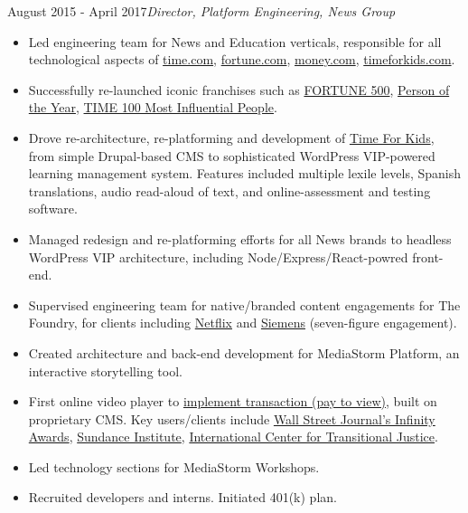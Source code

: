 \documentclass[a4paper,10pt]{memoir} %
\begin{document}
 {August 2015 - April 2017}{\textit{Director, Platform Engineering, News Group}}
\begin{itemize}
	\item Led engineering team for News and Education verticals, responsible for all technological aspects of \href{http://time.com}{time.com}, \href{http://fortune.com}{fortune.com},  \href{http://money.com}{money.com}, \href{https://www.timeforkids.com}{timeforkids.com}. 
	\item Successfully re-launched iconic franchises such as \href{http://fortune.com/fortune500}{FORTUNE 500}, \href{http://time.com/time-person-of-the-year-2017-silence-breakers/}{Person of the Year}, \href{http://time.com/collection/most-influential-people-2018/}{TIME 100 Most Influential People}.
	\item Drove re-architecture, re-platforming and development of \href{https://www.timeforkids}{Time For Kids}, from simple Drupal-based CMS to sophisticated WordPress VIP-powered learning management system. Features included multiple lexile levels, Spanish translations, audio read-aloud of text, and online-assessment and testing software.
	\item Managed redesign and re-platforming efforts for all News brands to headless WordPress VIP architecture, including Node/Express/React-powred front-end.
	\item Supervised engineering team for native/branded content engagements for The Foundry, for clients including \href{http://time.com/paid-content-from/netflix/dinnertime/}{Netflix} and \href{http://time.com/partner/siemens/innovation-starts-here/}{Siemens} (seven-figure engagement).
\end{itemize}
\Sep %

\begin{itemize}
	\item Created architecture and back-end development for MediaStorm Platform, an interactive storytelling tool. 
	\item First online video player to \href{http://time.com/46716/game-changer-mediastorm-launches-pay-per-story-video-player/}{implement transaction (pay to view)}, built on proprietary CMS. Key users/clients include \href{https://mediastorm.com/clients/2018-icp-infinity-awards}{Wall Street Journal's Infinity Awards}, \href{https://mediastorm.com/clients/sundance-short-film-challenge}{Sundance Institute}, \href{https://mediastorm.com/clients/i-am-not-who-they-think-i-am-for-ictj}{International Center for Transitional Justice}. 
	\item Led technology sections for MediaStorm Workshops.
	\item Recruited developers and interns. Initiated 401(k) plan.
\end{itemize}
\Sep %
\end{document}
